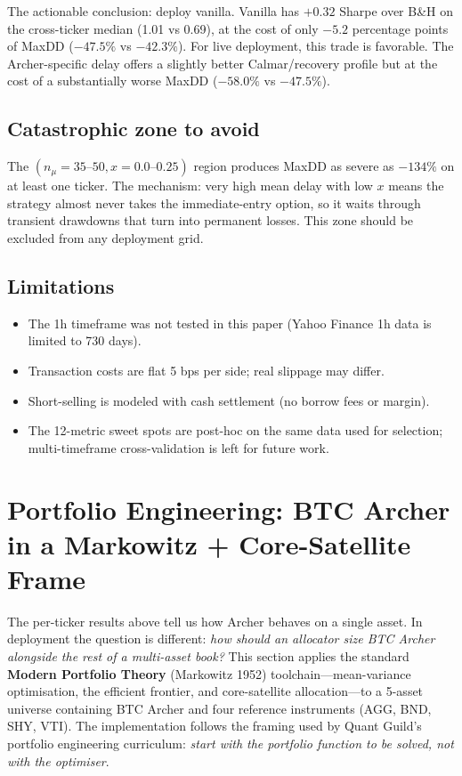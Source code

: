 \documentclass[11pt,a4paper]{article}
\begin{document}
The actionable conclusion: deploy vanilla. Vanilla has $+0.32$ Sharpe over B\&H on the cross-ticker median (1.01 vs 0.69), at the cost of only $-5.2$ percentage points of MaxDD ($-47.5\%$ vs $-42.3\%$). For live deployment, this trade is favorable. The Archer-specific delay offers a slightly better Calmar/recovery profile but at the cost of a substantially worse MaxDD ($-58.0\%$ vs $-47.5\%$).

\subsection{Catastrophic zone to avoid}

The $(n_\mu=35\text{--}50, x=0.0\text{--}0.25)$ region produces MaxDD as severe as $-134\%$ on at least one ticker. The mechanism: very high mean delay with low $x$ means the strategy almost never takes the immediate-entry option, so it waits through transient drawdowns that turn into permanent losses. This zone should be excluded from any deployment grid.

\subsection{Limitations}

\begin{itemize}
\item The 1h timeframe was not tested in this paper (Yahoo Finance 1h data is limited to 730 days).
\item Transaction costs are flat 5 bps per side; real slippage may differ.
\item Short-selling is modeled with cash settlement (no borrow fees or margin).
\item The 12-metric sweet spots are post-hoc on the same data used for selection; multi-timeframe cross-validation is left for future work.
\end{itemize}

\section{Portfolio Engineering: BTC Archer in a Markowitz + Core-Satellite Frame}

The per-ticker results above tell us how Archer behaves on a single asset. In deployment the question is different: \emph{how should an allocator size BTC Archer alongside the rest of a multi-asset book?} This section applies the standard \textbf{Modern Portfolio Theory} (Markowitz 1952) toolchain---mean-variance optimisation, the efficient frontier, and core-satellite allocation---to a 5-asset universe containing BTC Archer and four reference instruments (AGG, BND, SHY, VTI). The implementation follows the framing used by Quant Guild's portfolio engineering curriculum: \emph{start with the portfolio function to be solved, not with the optimiser}.
\end{document}
